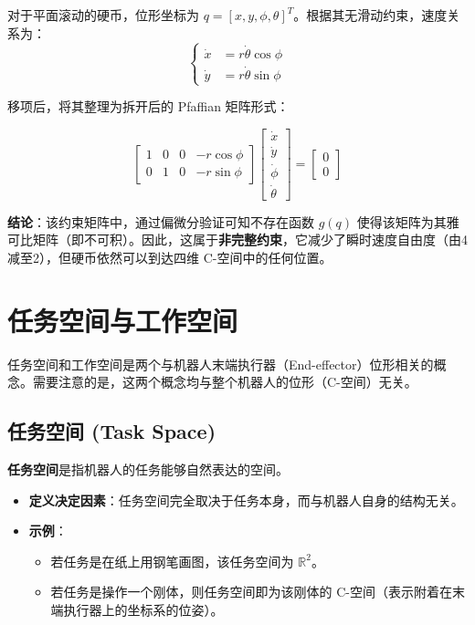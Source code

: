 对于平面滚动的硬币，位形坐标为 $q = [x, y, \phi, \theta]^T$。根据其无滑动约束，速度关系为：
\begin{equation}
\left\{
\begin{aligned}
    \dot{x} &= r \dot{\theta} \cos \phi \\
    \dot{y} &= r \dot{\theta} \sin \phi
\end{aligned}
\right.
\end{equation}



移项后，将其整理为拆开后的 Pfaffian 矩阵形式：
\begin{tcolorbox}[colback=red!5, colframe=red!75!black, title=滚动硬币约束（非完整约束矩阵）]
\begin{equation}
\begin{bmatrix}
    1 & 0 & 0 & -r\cos \phi \\
    0 & 1 & 0 & -r\sin \phi
\end{bmatrix}
\begin{bmatrix}
    \dot{x} \\ \dot{y} \\ \dot{\phi} \\ \dot{\theta}
\end{bmatrix}
=
\begin{bmatrix}
    0 \\ 0
\end{bmatrix}
\end{equation}
\end{tcolorbox}

\textbf{结论}：该约束矩阵中，通过偏微分验证可知不存在函数 $g(q)$ 使得该矩阵为其雅可比矩阵（即不可积）。因此，这属于\textbf{非完整约束}，它减少了瞬时速度自由度（由4减至2），但硬币依然可以到达四维 C-空间中的任何位置。

\section{任务空间与工作空间}

任务空间和工作空间是两个与机器人末端执行器（End-effector）位形相关的概念。需要注意的是，这两个概念均与整个机器人的位形（C-空间）无关。

\subsection{任务空间 (Task Space)}
\textbf{任务空间}是指机器人的任务能够自然表达的空间。
\begin{itemize}
    \item \textbf{定义决定因素}：任务空间完全取决于任务本身，而与机器人自身的结构无关。
    \item \textbf{示例}：
    \begin{itemize}
        \item 若任务是在纸上用钢笔画图，该任务空间为 $\mathbb{R}^2$。
        \item 若任务是操作一个刚体，则任务空间即为该刚体的 C-空间（表示附着在末端执行器上的坐标系的位姿）。
    \end{itemize}
\end{itemize}

